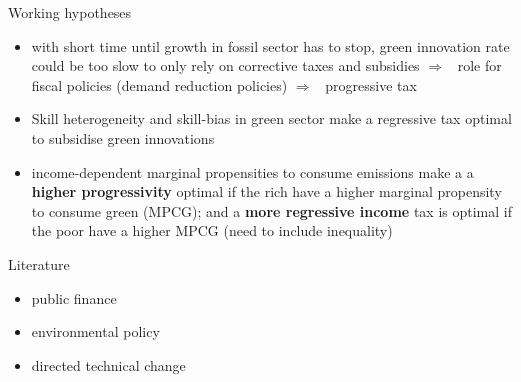 \documentclass[11pt,aspectratio=169]{beamer}
\newcommand{\ar}{$\Rightarrow$ \ }
\begin{document}
\begin{frame}{Working hypotheses}	
	\begin{itemize}
		\item<+-> with short time until growth in fossil sector has to stop, green innovation rate could be too slow to only rely on corrective taxes and subsidies \ar role for fiscal policies (demand reduction policies) \ar progressive tax
		\vspace{3mm}
		\item<+-> Skill heterogeneity and skill-bias in green sector make a regressive tax optimal to subsidise green innovations
		\vspace{3mm}
		\item<+-> income-dependent marginal propensities to consume emissions make a a \textbf{higher progressivity} optimal if the rich have a higher marginal propensity to consume green (MPCG); and a \textbf{more regressive income} tax is optimal if the poor have a higher MPCG (need to include inequality) 
	\end{itemize}
\end{frame}



\begin{frame}{Literature}
	\begin{itemize}
		\item public finance
		\item environmental policy
		\item directed technical change
	\end{itemize}
\end{frame}
\end{document}
